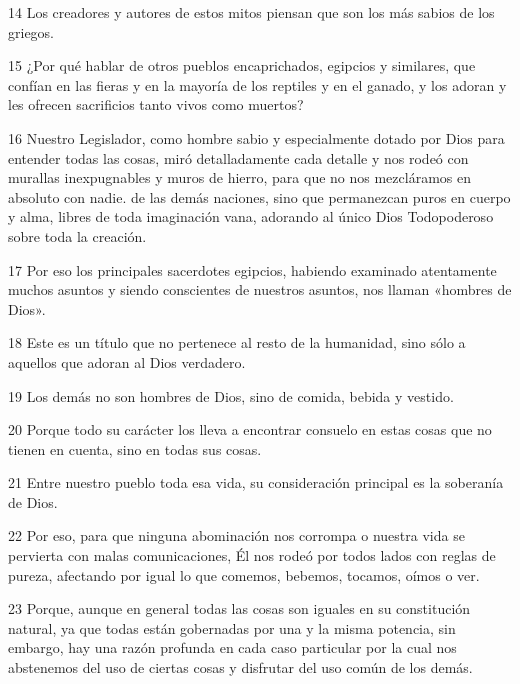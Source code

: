 \par 14 Los creadores y autores de estos mitos piensan que son los más sabios de los griegos.

\par 15 ¿Por qué hablar de otros pueblos encaprichados, egipcios y similares, que confían en las fieras y en la mayoría de los reptiles y en el ganado, y los adoran y les ofrecen sacrificios tanto vivos como muertos?

\par 16 Nuestro Legislador, como hombre sabio y especialmente dotado por Dios para entender todas las cosas, miró detalladamente cada detalle y nos rodeó con murallas inexpugnables y muros de hierro, para que no nos mezcláramos en absoluto con nadie. de las demás naciones, sino que permanezcan puros en cuerpo y alma, libres de toda imaginación vana, adorando al único Dios Todopoderoso sobre toda la creación.

\par 17 Por eso los principales sacerdotes egipcios, habiendo examinado atentamente muchos asuntos y siendo conscientes de nuestros asuntos, nos llaman «hombres de Dios».

\par 18 Este es un título que no pertenece al resto de la humanidad, sino sólo a aquellos que adoran al Dios verdadero.

\par 19 Los demás no son hombres de Dios, sino de comida, bebida y vestido.

\par 20 Porque todo su carácter los lleva a encontrar consuelo en estas cosas que no tienen en cuenta, sino en todas sus cosas.

\par 21 Entre nuestro pueblo toda esa vida, su consideración principal es la soberanía de Dios.

\par 22 Por eso, para que ninguna abominación nos corrompa o nuestra vida se pervierta con malas comunicaciones, Él nos rodeó por todos lados con reglas de pureza, afectando por igual lo que comemos, bebemos, tocamos, oímos o ver.

\par 23 Porque, aunque en general todas las cosas son iguales en su constitución natural, ya que todas están gobernadas por una y la misma potencia, sin embargo, hay una razón profunda en cada caso particular por la cual nos abstenemos del uso de ciertas cosas y disfrutar del uso común de los demás.

